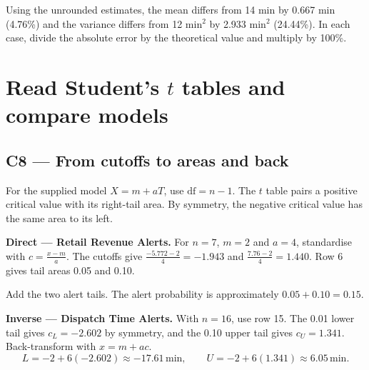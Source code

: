 Using the unrounded estimates, the mean differs from 14 min by 0.667 min (4.76\%) and the variance differs from 12 \(\mathrm{min}^2\) by 2.933 \(\mathrm{min}^2\) (24.44\%). In each case, divide the absolute error by the theoretical value and multiply by 100\%.

\clearpage
\section{Read Student's \texorpdfstring{\(t\)}{t} tables and compare models}

\subsection*{C8 --- From cutoffs to areas and back}

For the supplied model \(X=m+aT\), use \(\mathrm{df}=n-1\). The \(t\) table pairs a positive critical value with its right-tail area. By symmetry, the negative critical value has the same area to its left.

\textbf{Direct --- Retail Revenue Alerts.} For \(n=7\), \(m=2\) and \(a=4\), standardise with \(c=\frac{x-m}{a}\). The cutoffs give \(\frac{-5.772-2}{4}=-1.943\) and \(\frac{7.76-2}{4}=1.440\). Row 6 gives tail areas 0.05 and 0.10.

\begin{center}
  \par
  {\small Add the two alert tails. The alert probability is approximately \(0.05+0.10=0.15\).\par}
\end{center}

\textbf{Inverse --- Dispatch Time Alerts.} With \(n=16\), use row 15. The 0.01 lower tail gives \(c_L=-2.602\) by symmetry, and the 0.10 upper tail gives \(c_U=1.341\). Back-transform with \(x=m+ac\).
\[
  L=-2+6(-2.602)\approx-17.61\,\mathrm{min},
  \qquad U=-2+6(1.341)\approx6.05\,\mathrm{min}.
\]

